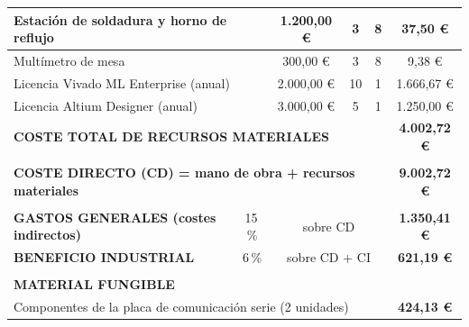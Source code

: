 \begin{table}[H]
{\begin{tabular}{lllllc}
\multicolumn{2}{|l|}{Estación de soldadura y horno de reflujo} &
\multicolumn{1}{c|}{1.200,00 \euro} &
\multicolumn{1}{c|}{3} &
\multicolumn{1}{c|}{8} &
\multicolumn{1}{c|}{37,50 \euro} \\
\hline

\multicolumn{2}{|l|}{Multímetro de mesa} &
\multicolumn{1}{c|}{300,00 \euro} &
\multicolumn{1}{c|}{3} &
\multicolumn{1}{c|}{8} &
\multicolumn{1}{c|}{9,38 \euro} \\
\hline

\multicolumn{2}{|l|}{Licencia Vivado ML Enterprise (anual)} &
\multicolumn{1}{c|}{2.000,00 \euro} &
\multicolumn{1}{c|}{10} &
\multicolumn{1}{c|}{1} &
\multicolumn{1}{c|}{1.666,67 \euro} \\
\hline

\multicolumn{2}{|l|}{Licencia Altium Designer (anual)} &
\multicolumn{1}{c|}{3.000,00 \euro} &
\multicolumn{1}{c|}{5} &
\multicolumn{1}{c|}{1} &
\multicolumn{1}{c|}{1.250,00 \euro} \\
\hline

\multicolumn{5}{|l|}{\textbf{COSTE TOTAL DE RECURSOS MATERIALES}} &
\multicolumn{1}{c|}{\textbf{4.002,72 \euro}} \\
\hline

& & & & &
\multicolumn{1}{l}{} \\
\hline

\multicolumn{5}{|l|}{\textbf{COSTE DIRECTO (CD) = mano de obra + recursos materiales}} &
\multicolumn{1}{c|}{\textbf{9.002,72 \euro}} \\
\hline

& & & & &
\multicolumn{1}{l}{} \\
\hline

\multicolumn{1}{|l|}{\textbf{GASTOS GENERALES (costes indirectos)}} &
\multicolumn{1}{c|}{15\,\%} &
\multicolumn{3}{c|}{sobre CD} &
\multicolumn{1}{c|}{\textbf{1.350,41 \euro}} \\
\hline

\multicolumn{1}{|l|}{\textbf{BENEFICIO INDUSTRIAL}} &
\multicolumn{1}{c|}{6\,\%} &
\multicolumn{3}{c|}{sobre CD + CI} &
\multicolumn{1}{c|}{\textbf{621,19 \euro}} \\
\hline

& & & & &
\multicolumn{1}{l}{} \\

\multicolumn{6}{l}{\textbf{MATERIAL FUNGIBLE}} \\
\hline

\multicolumn{5}{|l|}{Componentes de la placa de comunicación serie (2 unidades)} &
\multicolumn{1}{c|}{\textbf{424,13 \euro}} \\
\hline


\end{tabular}}
\end{table}

